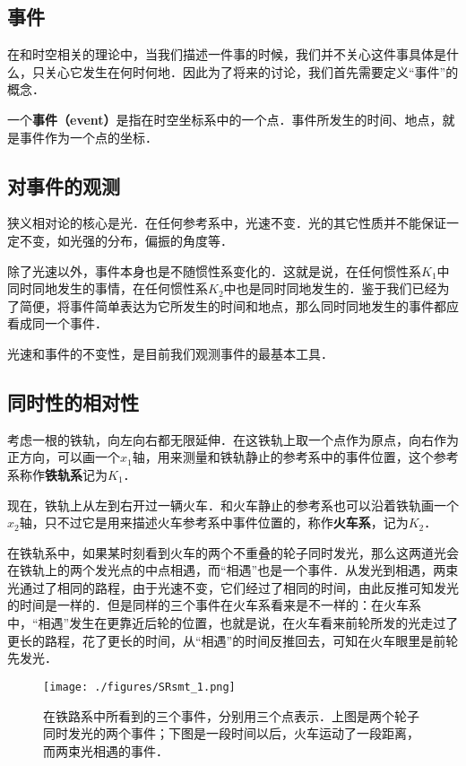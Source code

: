 

\subsection{事件}

在和时空相关的理论中，当我们描述一件事的时候，我们并不关心这件事具体是什么，只关心它发生在何时何地．因此为了将来的讨论，我们首先需要定义“事件”的概念．

一个\textbf{事件（event）}是指在时空坐标系中的一个点．事件所发生的时间、地点，就是事件作为一个点的坐标．

\subsection{对事件的观测}

狭义相对论的核心是光．在任何参考系中，光速不变．光的其它性质并不能保证一定不变，如光强的分布，偏振的角度等．

除了光速以外，事件本身也是不随惯性系变化的．这就是说，在任何惯性系$K_1$中同时同地发生的事情，在任何惯性系$K_2$中也是同时同地发生的．鉴于我们已经为了简便，将事件简单表达为它所发生的时间和地点，那么同时同地发生的事件都应看成同一个事件．

光速和事件的不变性，是目前我们观测事件的最基本工具．

\subsection{同时性的相对性}

考虑一根的铁轨，向左向右都无限延伸．在这铁轨上取一个点作为原点，向右作为正方向，可以画一个$x_1$轴，用来测量和铁轨静止的参考系中的事件位置，这个参考系称作\textbf{铁轨系}记为$K_1$．

现在，铁轨上从左到右开过一辆火车．和火车静止的参考系也可以沿着铁轨画一个$x_2$轴，只不过它是用来描述火车参考系中事件位置的，称作\textbf{火车系}，记为$K_2$．

在铁轨系中，如果某时刻看到火车的两个不重叠的轮子同时发光，那么这两道光会在铁轨上的两个发光点的中点相遇，而“相遇”也是一个事件．从发光到相遇，两束光通过了相同的路程，由于光速不变，它们经过了相同的时间，由此反推可知发光的时间是一样的．但是同样的三个事件在火车系看来是不一样的：在火车系中，“相遇”发生在更靠近后轮的位置，也就是说，在火车看来前轮所发的光走过了更长的路程，花了更长的时间，从“相遇”的时间反推回去，可知在火车眼里是前轮先发光．

\begin{figure}[ht]
\centering
\texttt{[image: ./figures/SRsmt\_1.png]}
\caption{在铁路系中所看到的三个事件，分别用三个点表示．上图是两个轮子同时发光的两个事件；下图是一段时间以后，火车运动了一段距离，而两束光相遇的事件．} \label{SRsmt_fig1}
\end{figure}

